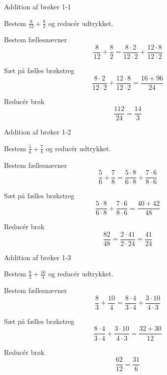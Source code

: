 \documentclass{article}
\begin{document}

	\tableofcontents
	\newpage
	
	\begin{exercise}{Addition af brøker 1-1}
		
		Bestem $\frac{8}{12}+\frac{8}{2}$ og reducér udtrykket.
		
		
		\hint
		
		Bestem fællesnævner
		\[
		\frac{8}{12}+\frac{8}{2}  = \frac{8 \cdot 2}{12 \cdot 2}+\frac{12 \cdot 8}{12\cdot 2} 
		\]
		
		\hint
		
		Sæt på fælles brøkstreg
		\[
		\frac{8 \cdot 2}{12 \cdot 2}+\frac{12 \cdot 8}{12\cdot 2} = \frac{16+96}{24} 
		\]
		
		\hint
		
		Reducér brøk
		\[
		\frac{112}{24} = \frac{14}{3}
		\]
		
	\end{exercise}
	
	\newpage
	
	\begin{exercise}{Addition af brøker 1-2}
		
		Bestem $\frac{5}{6}+\frac{7}{8}$ og reducér udtrykket.
		
		
		\hint
		
		Bestem fællesnævner
		\[
		\frac{5}{6}+\frac{7}{8}  = \frac{5 \cdot 8 }{6 \cdot 8}+\frac{7 \cdot 6}{8\cdot 6} 
		\]
		
		\hint
		
		Sæt på fælles brøkstreg
		\[
		\frac{5 \cdot 8 }{6 \cdot 8}+\frac{7 \cdot 6}{8\cdot 6}  = \frac{40+42}{48} 
		\]
		
		\hint
		
		Reducér brøk
		\[
		\frac{82}{48} = \frac{2 \cdot 41}{2 \cdot 24} = \frac{41}{24}
		\]
		
	\end{exercise}
	
	\newpage
	
	\begin{exercise}{Addition af brøker 1-3}
		
		Bestem $\frac{8}{3}+\frac{10}{4}$ og reducér udtrykket.
		
		
		\hint
		
		Bestem fællesnævner
		\[
		\frac{8}{3}+\frac{10}{4}  = \frac{8 \cdot 4 }{3 \cdot 4}+\frac{3 \cdot 10}{4\cdot 3} 
		\]
		
		\hint
		
		Sæt på fælles brøkstreg
		\[
		\frac{8 \cdot 4 }{3 \cdot 4}+\frac{3 \cdot 10}{4\cdot 3}  = \frac{32+30}{12} 
		\]
		
		\hint
		
		Reducér brøk
		\[
		\frac{62}{12} = \frac{31}{6}
		\]
		
	\end{exercise}
	
\end{document}

